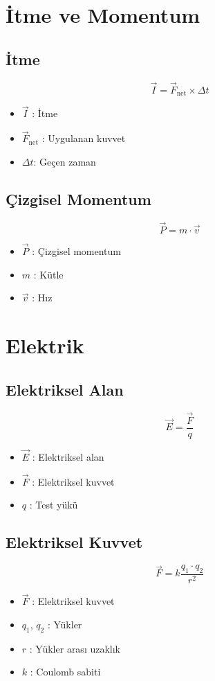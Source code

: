 \documentclass[a4paper, 11pt, titlepage]{article}
\begin{document}
\section{İtme ve Momentum}
\subsection{İtme}
\[
\vec{I} = \vec{F}_{\mathrm{net}} \times \Delta t
\]
\begin{itemize}
  \item $\vec{I}$ : İtme
  \item $\vec{F}_{\mathrm{net}}$ : Uygulanan kuvvet
  \item $\Delta t$: Geçen zaman
\end{itemize}



\subsection{Çizgisel Momentum}
\[
\vec{P} = m \cdot \vec{v}
\]
\begin{itemize}
  \item $\vec{P}$ : Çizgisel momentum
  \item $m$ : Kütle
  \item $\vec{v}$ : Hız
\end{itemize}
\section{Elektrik}

\subsection{Elektriksel Alan}
\[
\vec{E} = \frac{\vec{F}}{q}
\]
\begin{itemize}
  \item $\vec{E}$ : Elektriksel alan
  \item $\vec{F}$ : Elektriksel kuvvet
  \item $q$ : Test yükü
\end{itemize}


\subsection{Elektriksel Kuvvet}
\[
\vec{F} = k \frac{q_1 \cdot q_2}{r^2}
\]
\begin{itemize}
  \item $\vec{F}$ : Elektriksel kuvvet
  \item $q_1$, $q_2$ : Yükler
  \item $r$ : Yükler arası uzaklık
  \item $k$ : Coulomb sabiti
\end{itemize}
\end{document}
